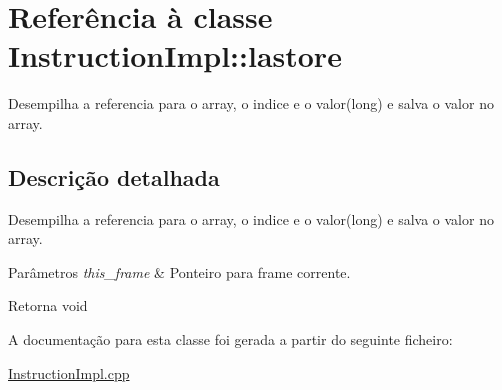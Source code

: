 \hypertarget{class_instruction_impl_1_1lastore}{}\section{Referência à classe Instruction\+Impl\+:\+:lastore}
\label{class_instruction_impl_1_1lastore}


Desempilha a referencia para o array, o indice e o valor(long) e salva o valor no array.  




\subsection{Descrição detalhada}
Desempilha a referencia para o array, o indice e o valor(long) e salva o valor no array. 


\begin{DoxyParams}{Parâmetros}
{\em this\+\_\+frame} & Ponteiro para frame corrente. \\
\hline
\end{DoxyParams}
\begin{DoxyReturn}{Retorna}
void 
\end{DoxyReturn}


A documentação para esta classe foi gerada a partir do seguinte ficheiro\+:\begin{DoxyCompactItemize}
\item 
\hyperlink{_instruction_impl_8cpp}{Instruction\+Impl.\+cpp}\end{DoxyCompactItemize}
